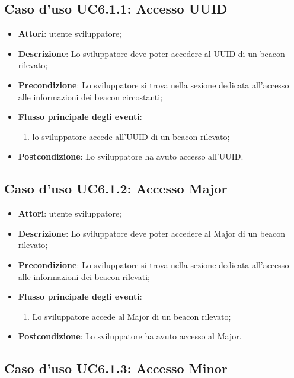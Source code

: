 \documentclass[../AnalisiDeiRequisiti.tex]{subfiles}
\begin{document}
\subsection{Caso d'uso UC6.1.1: Accesso UUID}
\begin{itemize}
\item \textbf{Attori}: utente sviluppatore;
\item \textbf{Descrizione}: Lo sviluppatore deve poter accedere al UUID di un beacon rilevato; 
      \item \textbf{Precondizione}: Lo sviluppatore si trova nella sezione dedicata all'accesso alle informazioni dei beacon circostanti;

        \item \textbf{Flusso principale degli eventi}:
          \begin{enumerate}
          \item lo sviluppatore accede all'UUID di un beacon rilevato;

      \end{enumerate}
    \item \textbf{Postcondizione}: Lo sviluppatore ha avuto accesso all'UUID.
  \end{itemize}
\hypertarget{UC6.1.2}{}
\subsection{Caso d'uso UC6.1.2: Accesso Major}

\begin{itemize}
\item \textbf{Attori}: utente sviluppatore;
\item \textbf{Descrizione}: Lo sviluppatore deve poter accedere al Major di un beacon rilevato; 
      \item \textbf{Precondizione}: Lo sviluppatore si trova nella sezione dedicata all'accesso alle informazioni dei beacon rilevati;

        \item \textbf{Flusso principale degli eventi}:
          \begin{enumerate}
          \item Lo sviluppatore accede al Major di un beacon rilevato;

      \end{enumerate}
    \item \textbf{Postcondizione}: Lo sviluppatore ha avuto accesso al Major.
  \end{itemize}
\hypertarget{UC6.1.3}{}
\subsection{Caso d'uso UC6.1.3: Accesso Minor}
\end{document}
